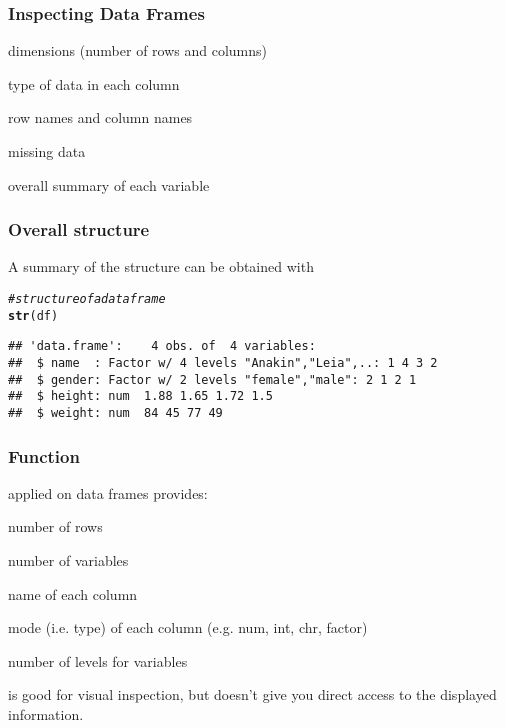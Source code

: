 \documentclass[12pt]{beamer}\usepackage[]{graphicx}\usepackage[]{color}
\makeatletter
\newcommand{\hlcom}[1]{\textcolor[rgb]{0.678,0.584,0.686}{\textit{#1}}}%
\newcommand{\hlstd}[1]{\textcolor[rgb]{0.345,0.345,0.345}{#1}}%
\newcommand{\hlkwd}[1]{\textcolor[rgb]{0.737,0.353,0.396}{\textbf{#1}}}%
\newenvironment{kframe}{%
 \def\at@end@of@kframe{}%
 \ifinner\ifhmode%
  \def\at@end@of@kframe{\end{minipage}}%
  \begin{minipage}{\columnwidth}%
 \fi\fi%
 \def\FrameCommand##1{\hskip\@totalleftmargin \hskip-\fboxsep
 \colorbox{shadecolor}{##1}\hskip-\fboxsep
     \hskip-\linewidth \hskip-\@totalleftmargin \hskip\columnwidth}%
 \MakeFramed {\advance\hsize-\width
   \@totalleftmargin\z@ \linewidth\hsize
   \@setminipage}}%
 {\par\unskip\endMakeFramed%
 \at@end@of@kframe}
\newenvironment{knitrout}{}{} %
\makeatother
\begin{document}

\begin{frame}
\frametitle{Inspecting Data Frames}
\bi
  \item dimensions (number of rows and columns)
  \item type of data in each column
  \item row names and column names
  \item missing data
  \item overall summary of each variable
\ei

\end{frame}


\begin{frame}[fragile]
\frametitle{Overall structure}

A summary of the structure can be obtained with {\hilit {}}

\begin{knitrout}\footnotesize
{}\color{fgcolor}\begin{kframe}
\begin{alltt}
\hlcom{# structure of a data frame}
\hlkwd{str}\hlstd{(df)}
\end{alltt}
\begin{verbatim}
## 'data.frame':	4 obs. of  4 variables:
##  $ name  : Factor w/ 4 levels "Anakin","Leia",..: 1 4 3 2
##  $ gender: Factor w/ 2 levels "female","male": 2 1 2 1
##  $ height: num  1.88 1.65 1.72 1.5
##  $ weight: num  84 45 77 49
\end{verbatim}
\end{kframe}
\end{knitrout}

\end{frame}


\begin{frame}[fragile]
\frametitle{Function }

 applied on data frames provides:
\bi
  \item number of rows
  \item number of variables
  \item name of each column
  \item mode (i.e. type) of each column (e.g. num, int, chr, factor)
  \item number of levels for  variables
\ei

 is good for visual inspection, but doesn't give you direct access to the displayed information.

\end{frame}
\end{document}
